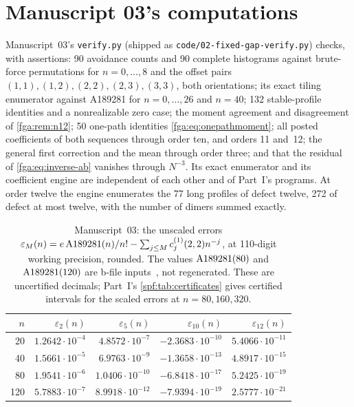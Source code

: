 \documentclass[11pt]{article}
\numberwithin{equation}{section}
\theoremstyle{definition}
\theoremstyle{remark}
\theoremstyle{definition}
\newcommand{\Aone}{\textnormal{A189281}}
\begin{document}
\section{Manuscript 03's computations}
\label{fga:sec:numerics}

Manuscript~03's \texttt{verify.py} (shipped as
\texttt{code/02-fixed-gap-verify.py}) checks, with assertions: 90 avoidance
counts and 90 complete histograms against brute-force permutations for
$n=0,\ldots,8$ and the offset pairs $(1,1),(1,2),(2,2),(2,3),(3,3)$, both
orientations; its exact tiling enumerator against A189281 for
$n=0,\ldots,26$ and $n=40$; 132 stable-profile identities and a
nonrealizable zero case; the moment agreement and disagreement of
\cref{fga:rem:n12}; 50 one-path identities \eqref{fga:eq:onepathmoment};
all posted coefficients of both sequences through order ten, and orders 11
and~12; the general first correction and the mean through order three; and
that the residual of \eqref{fga:eq:inverse-ab} vanishes through $N^{-3}$.
Its exact enumerator and its coefficient engine are independent of each
other and of Part~I's programs. At order twelve the engine enumerates the
77 long profiles of defect twelve, 272 of defect at most twelve, with the
number of dimers summed exactly.

\begin{table}[htbp]
\centering\small
\begin{tabular}{rrrrr}
\toprule
$n$ & $\varepsilon_2(n)$ & $\varepsilon_5(n)$ & $\varepsilon_{10}(n)$ & $\varepsilon_{12}(n)$\\
\midrule
20  & $1.2642\cdot10^{-4}$ & $4.8572\cdot10^{-7}$ & $-2.3683\cdot10^{-10}$ & $5.4066\cdot10^{-11}$\\
40  & $1.5661\cdot10^{-5}$ & $6.9763\cdot10^{-9}$ & $-1.3658\cdot10^{-13}$ & $4.8917\cdot10^{-15}$\\
80  & $1.9541\cdot10^{-6}$ & $1.0406\cdot10^{-10}$ & $-6.8418\cdot10^{-17}$ & $5.2425\cdot10^{-19}$\\
120 & $5.7883\cdot10^{-7}$ & $8.9918\cdot10^{-12}$ & $-7.9394\cdot10^{-19}$ & $2.5777\cdot10^{-21}$\\
\bottomrule
\end{tabular}
\caption{Manuscript~03: the unscaled errors
$\varepsilon_M(n)=e\,\Aone(n)/n!-\sum_{j\le M}c_j^{(1)}(2,2)n^{-j}$, at
110-digit working precision, rounded. The values $\Aone(80)$ and
$\Aone(120)$ are b-file inputs~\cite{fgaBfile}, not regenerated. These are
uncertified decimals; Part~I's \cref{spf:tab:certificates} gives certified
intervals for the scaled errors at $n=80,160,320$.}
\label{fga:tab:errors}
\end{table}
\end{document}
